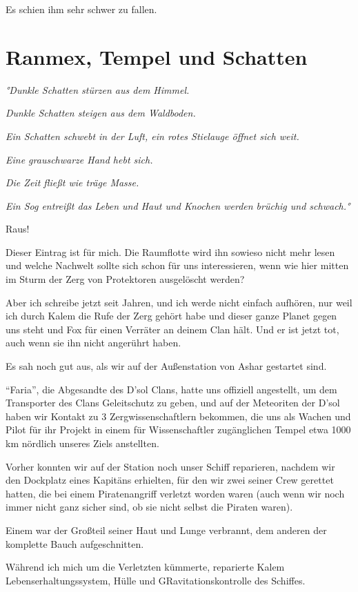 \documentclass[11pt]{scrartcl}
\begin{document}
Es schien ihm sehr schwer zu fallen.

\section{Ranmex, Tempel und Schatten}

\emph{°Dunkle Schatten stürzen aus dem Himmel.}

\emph{Dunkle Schatten steigen aus dem Waldboden.}

\emph{Ein Schatten schwebt in der Luft, ein rotes Stielauge öffnet sich
weit.}

\emph{Eine grauschwarze Hand hebt sich.}

\emph{Die Zeit fließt wie träge Masse.}

\emph{Ein Sog entreißt das Leben und Haut und Knochen werden brüchig und
schwach.°}

Raus!

Dieser Eintrag ist für mich. Die Raumflotte wird ihn sowieso nicht mehr
lesen und welche Nachwelt sollte sich schon für uns interessieren, wenn
wie hier mitten im Sturm der Zerg von Protektoren ausgelöscht werden?

Aber ich schreibe jetzt seit Jahren, und ich werde nicht einfach
aufhören, nur weil ich durch Kalem die Rufe der Zerg gehört habe und
dieser ganze Planet gegen uns steht und Fox für einen Verräter an deinem
Clan hält. Und er ist jetzt tot, auch wenn sie ihn nicht angerührt
haben.

Es sah noch gut aus, als wir auf der Außenstation von Ashar gestartet
sind.

``Faria'', die Abgesandte des D'sol Clans, hatte uns offiziell
angestellt, um dem Transporter des Clans Geleitschutz zu geben, und auf
der Meteoriten der D'sol haben wir Kontakt zu 3 Zergwissenschaftlern
bekommen, die uns als Wachen und Pilot für ihr Projekt in einem für
Wissenschaftler zugänglichen Tempel etwa 1000 km nördlich unseres Ziels
anstellten.

Vorher konnten wir auf der Station noch unser Schiff reparieren, nachdem
wir den Dockplatz eines Kapitäns erhielten, für den wir zwei seiner Crew
gerettet hatten, die bei einem Piratenangriff verletzt worden waren
(auch wenn wir noch immer nicht ganz sicher sind, ob sie nicht selbst
die Piraten waren).

Einem war der Großteil seiner Haut und Lunge verbrannt, dem anderen der
komplette Bauch aufgeschnitten.

Während ich mich um die Verletzten kümmerte, reparierte Kalem
Lebenserhaltungssystem, Hülle und GRavitationskontrolle des Schiffes.
\end{document}
